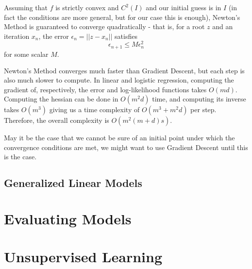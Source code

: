 \documentclass{article}
\begin{document}
Assuming that $f$ is strictly convex and $C^2(I)$ and our initial guess is in $I$ (in fact the conditions are more general, but for our case this is enough), Newton's Method is guaranteed to converge quadratically - that is, for a root $z$ and an iteration $x_n$, the error $\epsilon_n = ||z - x_n||$ satisfies
$$
\epsilon_{n+1} \leq M \epsilon_n^2
$$
for some scalar $M$.

Newton's Method converges much faster than Gradient Descent, but each step is also much slower to compute.
In linear and logistic regression, computing the gradient of, respectively, the error and log-likelihood functions takes $O(md)$.
Computing the hessian can be done in $O(m^2d)$ time, and computing its inverse takes $O(m^3)$ giving us a time complexity of $O(m^3 + m^2d)$ per step.
Therefore, the overall complexity is $O(m^2(m+d)s)$.

May it be the case that we cannot be sure of an initial point under which the convergence conditions are met, we might want to use Gradient Descent until this is the case.

\subsection{Generalized Linear Models}

\section{Evaluating Models}

\section{Unsupervised Learning}
\end{document}
